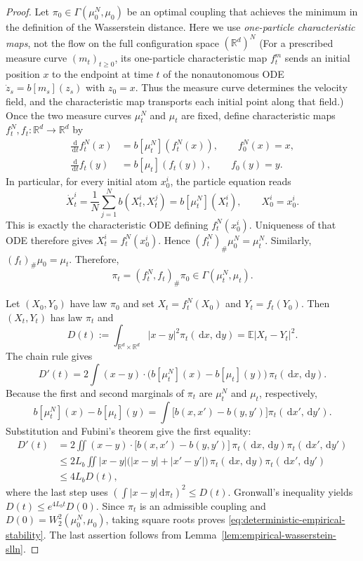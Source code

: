 \documentclass[11pt]{amsart}
\numberwithin{equation}{section}
\theoremstyle{plain}
\newcommand{\R}{\mathbb{R}}
\newcommand{\E}{\mathbb{E}}
\newcommand{\dd}{\,\mathrm{d}}
\newcommand{\abs}[1]{\left\lvert#1\right\rvert}
\begin{document}
\begin{proof}
Let $\pi_0\in\Gamma(\mu_0^N,\mu_0)$ be an optimal coupling that achieves the minimum in the definition of the Wasserstein distance. Here we
use \emph{one-particle characteristic maps}, not the flow on the full
configuration space $(\R^d)^N$ (For a prescribed measure curve $(m_t)_{t\geq0}$, its one-particle characteristic map $f_t^m$ sends an initial position $x$ to the endpoint at
time $t$ of the nonautonomous ODE $  \dot z_s=b[m_s](z_s)$ with $z_0=x$.
Thus the measure curve determines the velocity field, and the characteristic
map transports each initial point along that field.)
Once the two measure curves $\mu_t^N$ and
$\mu_t$ are fixed, define characteristic maps $f_t^N,f_t:\R^d\to\R^d$ by
\begin{align*}
 \frac{\dd}{\dd t}f_t^N(x) &=b[\mu_t^N](f_t^N(x)),\qquad f_0^N(x)=x, \\
 \frac{\dd}{\dd t}f_t(y)   &=b[\mu_t](f_t(y)),\qquad f_0(y)=y.
\end{align*}
In particular, for every initial atom $x_0^{i}$, the particle equation reads
\[
 \dot X_t^{i}
 =\frac1N\sum_{j=1}^N b(X_t^{i},X_t^{j})
 =b[\mu_t^N](X_t^{i}),\qquad X_0^{i}=x_0^{i}.
\]
This is exactly the characteristic ODE defining $f_t^N(x_0^{i})$.
Uniqueness of that ODE therefore gives $X_t^{i}=f_t^N(x_0^{i})$.
Hence
$(f_t^N)_\#\mu_0^N=\mu_t^N$.  Similarly,
$(f_t)_\#\mu_0=\mu_t$.  Therefore,
\[
\pi_t=(f_t^N,f_t)_\#\pi_0\in\Gamma(\mu_t^N,\mu_t).
\]

Let $(X_0,Y_0)$ have law $\pi_0$ and set $X_t=f_t^N(X_0)$ and $Y_t=f_t(Y_0)$.  Then $(X_t,Y_t)$ has law $\pi_t$ and
\[ D(t):=\int_{\R^d\times\R^d}\abs{x-y}^2\pi_t(\dd x,\dd y)= \E|X_t-Y_t|^2.
\]
The chain rule gives
\[
 D'(t)=2\int (x-y)\cdot
 \bigl(b[\mu_t^N](x)-b[\mu_t](y)\bigr)\,\pi_t(\dd x,\dd y).
\]
Because the first and second marginals of $\pi_t$ are $\mu_t^N$ and
$\mu_t$, respectively,
\[
 b[\mu_t^N](x)-b[\mu_t](y)
 =\int\bigl[b(x,x')-b(y,y')\bigr]  \pi_t(\dd x',\dd y').
\]
Substitution and Fubini's theorem give the first equality:
\begin{align*}
 D'(t)
 &=2\iint (x-y)\cdot
   \bigl[b(x,x')-b(y,y')\bigr]\,
   \pi_t(\dd x,\dd y)\pi_t(\dd x',\dd y')\\
 &\leq2L_b\iint\abs{x-y}
   \bigl(\abs{x-y}+\abs{x'-y'}\bigr)\,
   \pi_t(\dd x,\dd y)\pi_t(\dd x',\dd y')\\
 &\leq4L_bD(t),
\end{align*}
where the last step uses
$(\int\abs{x-y}\dd\pi_t)^2\leq D(t)$.  Gronwall's inequality yields
$D(t)\leq e^{4L_bt}D(0)$.  Since $\pi_t$ is an admissible coupling and
$D(0)=W_2^2(\mu_0^N,\mu_0)$, taking square roots proves
\eqref{eq:deterministic-empirical-stability}.  The last assertion follows
from Lemma~\ref{lem:empirical-wasserstein-slln}.
\end{proof}
\end{document}
